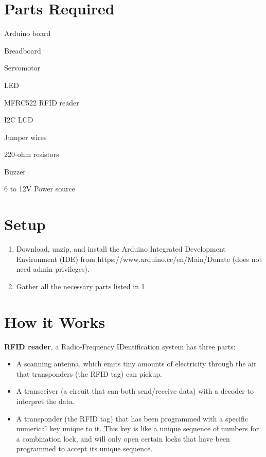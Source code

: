 \documentclass{article}
\begin{document}
\section{Parts Required}\label{sec:parts}

\begin{itemize}
\begin{minipage}{0.4\linewidth}
    \item Arduino board
    \item Breadboard
    \item Servomotor
    \item LED
    \item MFRC522 RFID reader
\end{minipage}
\begin{minipage}{0.4\linewidth}
    \item I2C LCD
    \item Jumper wires
    \item 220-ohm resistors
    \item Buzzer
    \item 6 to 12V Power source
\end{minipage}
\end{itemize}

\section{Setup}
\begin{enumerate}
\item {Download, unzip, and install the Arduino Integrated Development Environment
    (IDE) from https://www.arduino.cc/en/Main/Donate (does not need admin
    privileges).}
\item {Gather all the necessary parts listed in \ref{sec:parts}}  
\end{enumerate}

\section{How it Works}

\textbf{RFID reader}, a Radio-Frequency IDentification system has three parts:
\begin{itemize}
\item A scanning antenna, which emits tiny amounts of electricity through the air
  that transponders (the RFID tag) can pickup.
\item A transceiver (a circuit that can both send/receive data) with a decoder to
  interpret the data.
\item A transponder (the RFID tag) that has been programmed with a specific numerical
  key unique to it. This key is like a unique sequence of numbers for a combination
  lock, and will only open certain locks that have been programmed to accept its
  unique sequence.
\end{itemize}
\end{document}
